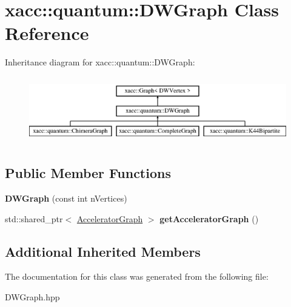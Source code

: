 \hypertarget{a01201}{}\section{xacc\+:\+:quantum\+:\+:D\+W\+Graph Class Reference}
\label{a01201}
Inheritance diagram for xacc\+:\+:quantum\+:\+:D\+W\+Graph\+:\begin{figure}[H]
\begin{center}
\leavevmode
\includegraphics[height=2.916667cm]{a01201}
\end{center}
\end{figure}
\subsection*{Public Member Functions}
\begin{DoxyCompactItemize}
\item 
\mbox{\label{a01201_adc891c7ec39fbb480d9102c3b0458e4c}} 
{\bfseries D\+W\+Graph} (const int n\+Vertices)
\item 
\mbox{\label{a01201_acdce3a79dfc4e296c215ac95f6fef8f5}} 
std\+::shared\+\_\+ptr$<$ \hyperlink{a01713}{Accelerator\+Graph} $>$ {\bfseries get\+Accelerator\+Graph} ()
\end{DoxyCompactItemize}
\subsection*{Additional Inherited Members}


The documentation for this class was generated from the following file\+:\begin{DoxyCompactItemize}
\item 
D\+W\+Graph.\+hpp\end{DoxyCompactItemize}
